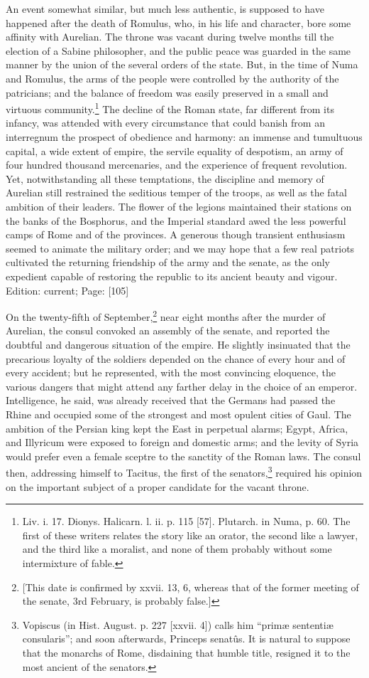 An event somewhat similar, but much less authentic, is supposed to have happened after the death of Romulus, who, in his life and character, bore some affinity with Aurelian. The throne was vacant during twelve months till the election of a Sabine philosopher, and the public peace was guarded in the same manner by the union of the several orders of the state. But, in the time of Numa and Romulus, the arms of the people were controlled by the authority of the patricians; and the balance of freedom was easily preserved in a small and virtuous community.\footnote{Liv. i. 17. Dionys. Halicarn. l. ii. p. 115 [57]. Plutarch. in Numa, p. 60. The first of these writers relates the story like an orator, the second like a lawyer, and the third like a moralist, and none of them probably without some intermixture of fable.} The decline of the Roman state, far different from its infancy, was attended with every circumstance that could banish from an interregnum the prospect of obedience and harmony: an immense and tumultuous capital, a wide extent of empire, the servile equality of despotism, an army of four hundred thousand mercenaries, and the experience of frequent revolution. Yet, notwithstanding all these temptations, the discipline and memory of Aurelian still restrained the seditious temper of the troops, as well as the fatal ambition of their leaders. The flower of the legions maintained their stations on the banks of the Bosphorus, and the Imperial standard awed the less powerful camps of Rome and of the provinces. A generous though transient enthusiasm seemed to animate the military order; and we may hope that a few real patriots cultivated the returning friendship of the army and the senate, as the only expedient capable of restoring the republic to its ancient beauty and vigour.
Edition: current; Page: [105]

On the twenty-fifth of September,\footnote{[This date is confirmed by xxvii. 13, 6, whereas that of the former meeting of the senate, 3rd February, is probably false.]} near eight months after the murder of Aurelian, the consul convoked an assembly of the senate, and reported the doubtful and dangerous situation of the empire. He slightly insinuated that the precarious loyalty of the soldiers depended on the chance of every hour and of every accident; but he represented, with the most convincing eloquence, the various dangers that might attend any farther delay in the choice of an emperor. Intelligence, he said, was already received that the Germans had passed the Rhine and occupied some of the strongest and most opulent cities of Gaul. The ambition of the Persian king kept the East in perpetual alarms; Egypt, Africa, and Illyricum were exposed to foreign and domestic arms; and the levity of Syria would prefer even a female sceptre to the sanctity of the Roman laws. The consul then, addressing himself to Tacitus, the first of the senators,\footnote{Vopiscus (in Hist. August. p. 227 [xxvii. 4]) calls him \texthebrew{“}primæ sententiæ consularis\texthebrew{}”; and soon afterwards, Princeps senatûs. It is natural to suppose that the monarchs of Rome, disdaining that humble title, resigned it to the most ancient of the senators.} required his opinion on the important subject of a proper candidate for the vacant throne.

